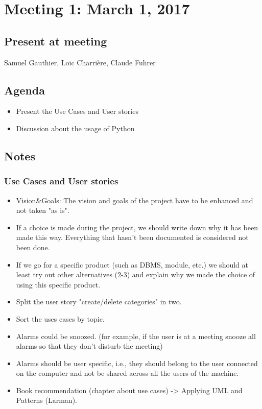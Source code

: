 \section{Meeting 1: March 1, 2017}
\subsection*{Present at meeting}
Samuel Gauthier, Loïc Charrière, Claude Fuhrer
\subsection*{Agenda}
\begin{itemize}
	\item Present  the Use Cases  and User stories
	\item Discussion about the usage of Python
\end{itemize}
\subsection*{Notes}
	\subsubsection{Use Cases and User stories}
	\begin{itemize}
        	\item Vision\&Goals: The vision and goals of the project have to be enhanced and not taken "as is".
		\item If a choice is made during the project, we should write down why it has been made this way. Everything that hasn't been documented is considered not been done.
		\item If we go for a specific product (such as DBMS, module, etc.) we should at least try out other alternatives (2-3) and explain why we made the choice of using this specific product.
		\item Split the user story "create/delete categories" in two.
		\item Sort the uses cases by topic.
		\item Alarms could be snoozed. (for example, if the user is at a meeting snooze all alarms so that they don't disturb the meeting) 
		\item Alarms should be user specific, i.e., they should belong to the user connected on the computer and not be shared across all the users of the machine.
		\item Book recommendation (chapter about use cases) -> Applying UML and Patterns (Larman).
	\end{itemize}
